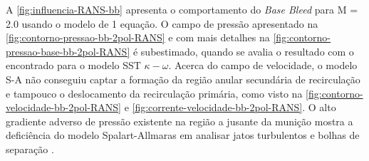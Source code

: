 A \autoref{fig:influencia-RANS-bb} apresenta o comportamento do \textit{Base Bleed} para M = \num{2,0} usando o modelo de 1 equação. O campo de pressão apresentado na \autoref{fig:contorno-pressao-bb-2pol-RANS} e com mais detalhes na \autoref{fig:contorno-pressao-base-bb-2pol-RANS} é subestimado, quando se avalia o resultado com o encontrado para o modelo SST \(\kappa-\omega\). Acerca do campo de velocidade, o modelo S-A não conseguiu captar a formação da região anular secundária de recirculação e tampouco o deslocamento da recirculação primária, como visto na \autoref{fig:contorno-velocidade-bb-2pol-RANS} e \autoref{fig:corrente-velocidade-bb-2pol-RANS}. O alto gradiente adverso de pressão existente na região a jusante da munição mostra a deficiência do modelo Spalart-Allmaras em analisar jatos turbulentos e bolhas de separação \cite{Wilcox2006}. 

